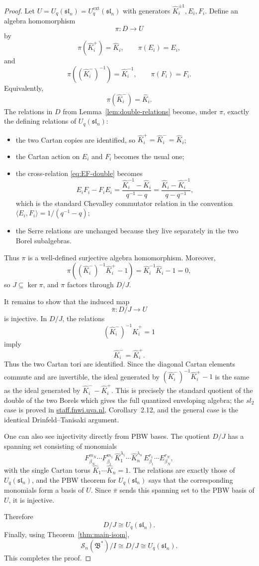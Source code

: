\documentclass[11pt]{article}
\newcommand{\bcS}{\mathcal S}
\newcommand{\fB}{\mathfrak B}
\newcommand{\sln}{\mathfrak{sl}_n}
\newcommand{\la}{\langle}
\newcommand{\ra}{\rangle}
\newcommand{\Khat}{\widehat K}
\begin{document}
\begin{proof}
Let \(U=U_q(\sln)=U_q^{\mathrm{ext}}(\sln)\) with generators \(\Khat_i^{\pm1},E_i,F_i\).  Define an algebra homomorphism
\[
\pi:D\longrightarrow U
\]
by
\[
\pi(\Khat_i^+)=\Khat_i,\qquad
\pi(E_i)=E_i,
\]
and
\[
\pi((\Khat_i^-)^{-1})=\Khat_i^{-1},\qquad
\pi(F_i)=F_i.
\]
Equivalently,
\[
\pi(\Khat_i^-)=\Khat_i.
\]
The relations in \(D\) from Lemma~\ref{lem:double-relations} become, under \(\pi\), exactly the defining relations of \(U_q(\sln)\):
\begin{itemize}
\item the two Cartan copies are identified, so \(\Khat_i^+=\Khat_i^-= \Khat_i\);
\item the Cartan action on \(E_i\) and \(F_i\) becomes the usual one;
\item the cross-relation \eqref{eq:EF-double} becomes
\[
E_iF_i-F_iE_i
=
\frac{\Khat_i^{-1}-\Khat_i}{q^{-1}-q}
=
\frac{\Khat_i-\Khat_i^{-1}}{q-q^{-1}},
\]
which is the standard Chevalley commutator relation in the convention \(\la E_i,F_i\ra=1/(q^{-1}-q)\);
\item the Serre relations are unchanged because they live separately in the two Borel subalgebras.
\end{itemize}
Thus \(\pi\) is a well-defined surjective algebra homomorphism.  Moreover,
\[
\pi((\Khat_i^-)^{-1}\Khat_i^+-1)=\Khat_i^{-1}\Khat_i-1=0,
\]
so \(J\subseteq\ker\pi\), and \(\pi\) factors through \(D/J\).

It remains to show that the induced map
\[
\overline\pi:D/J\longrightarrow U
\]
is injective.  In \(D/J\), the relations
\[
(\Khat_i^-)^{-1}\Khat_i^+=1
\]
imply
\[
\Khat_i^-=\Khat_i^+.
\]
Thus the two Cartan tori are identified.  Since the diagonal Cartan elements commute and are invertible, the ideal generated by \((\Khat_i^-)^{-1}\Khat_i^+-1\) is the same as the ideal generated by \(\Khat_i^--\Khat_i^+\).  This is precisely the standard quotient of the double of the two Borels which gives the full quantized enveloping algebra; the \(sl_2\) case is proved in
\href{https://staff.fnwi.uva.nl/j.v.stokman/quantumdouble2.pdf}{staff.fnwi.uva.nl}, Corollary~2.12, and the general case is the identical Drinfeld--Tanisaki argument.

One can also see injectivity directly from PBW bases.  The quotient \(D/J\) has a spanning set consisting of monomials
\[
F_{\beta_N}^{m_N}\cdots F_{\beta_1}^{m_1}\,
\Khat_1^{\lambda_1}\cdots \Khat_n^{\lambda_n}\,
E_{\beta_1}^{r_1}\cdots E_{\beta_N}^{r_N},
\]
with the single Cartan torus \(\Khat_1\cdots\Khat_n=1\).  The relations are exactly those of \(U_q(\sln)\), and the PBW theorem for \(U_q(\sln)\) says that the corresponding monomials form a basis of \(U\).  Since \(\overline\pi\) sends this spanning set to the PBW basis of \(U\), it is injective.

Therefore
\[
D/J\cong U_q(\sln).
\]
Finally, using Theorem~\ref{thm:main-isom},
\[
\bcS_n(\fB^*)/I
\cong
D/J
\cong
U_q(\sln).
\]
This completes the proof.
\end{proof}
\end{document}
